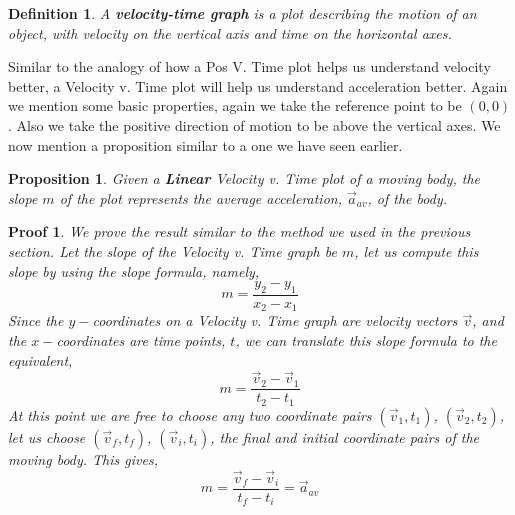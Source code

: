 \documentclass[12pt]{article}
\theoremstyle{break}
\newtheorem*{pf}{Proof}
\newtheorem{defn}{Definition}[subsection]
\newtheorem{prop}[thm]{Proposition}
\begin{document}
\begin{defn}
A \textbf{velocity-time graph} is a plot describing the motion of an object, with velocity on the vertical axis and time on the horizontal axes.
\end{defn}
Similar to the analogy of how a Pos V. Time plot helps us understand velocity better, a Velocity v. Time plot will help us understand acceleration better. Again we mention some basic properties, again we take the reference point to be $(0,0)$. Also we take the positive direction of motion to be above the vertical axes. We now mention a proposition similar to a one we have seen earlier.
\begin{prop}
Given a \textbf{Linear} Velocity v. Time plot of a moving body, the slope $m$ of the plot represents the average acceleration, $\vec a_{av}$, of the body.
\end{prop}
\begin{pf}
We prove the result similar to the method we used in the previous section. Let the slope of the Velocity v. Time graph be $m$, let us compute this slope by using the slope formula, namely,
$$m = \frac{y_2 - y_1}{x_2 - x_1}$$
Since the $y-$coordinates on a Velocity v. Time graph are velocity vectors $\vec v$, and the $x-$coordinates are time points, $t$, we can translate this slope formula to the equivalent,
$$m = \frac{\vec v_2 - \vec v_1}{t_2 - t_1}$$
At this point we are free to choose any two coordinate pairs $(\vec v_1,t_1)$, $(\vec v_2, t_2)$, let us choose $(\vec v_f, t_f)$, $(\vec v_i, t_i)$, the final and initial coordinate pairs of the moving body. This gives,
$$m = \frac{\vec v_f - \vec v_i}{t_f - t_i} = \vec a_{av}$$ 
\end{pf}
\end{document}
